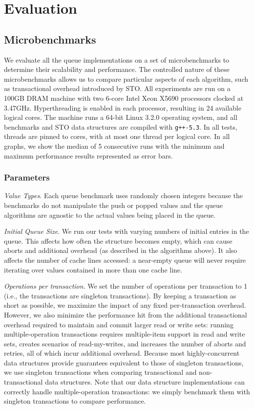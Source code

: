 \section{Evaluation}

\subsection{Microbenchmarks}
\label{q_microbenchmarks}

We evaluate all the queue implementations on a set of microbenchmarks to determine their scalability and performance. The controlled nature of these microbenchmarks allows us to compare particular aspects of each algorithm, such as transactional overhead introduced by STO. All experiments are run on a 100GB DRAM machine with two 6-core Intel Xeon X5690 processors clocked at 3.47GHz. Hyperthreading is enabled in each processor, resulting in 24 available logical cores. The machine runs a 64-bit Linux 3.2.0 operating system, and all benchmarks and STO data structures are compiled with \texttt{g++-5.3}. In all tests, threads are pinned to cores, with at most one thread per logical core.
In all graphs, we show the median of 5 consecutive runs with the minimum and maximum performance results represented as error bars.

\subsubsection{Parameters}

\emph{Value Types}. Each queue benchmark uses randomly chosen integers because the benchmarks do not manipulate the push or popped values and the queue algorithms are agnostic to the actual values being placed in the queue.

\emph{Initial Queue Size}. We run our tests with varying numbers of initial entries in the queue. This affects how often the structure becomes empty, which can cause aborts and additional overhead (as described in the algorithms above). It also affects the number of cache lines accessed: a near-empty queue will never require iterating over values contained in more than one cache line.

\emph{Operations per transaction}. We set the number of operations per transaction to 1 (i.e., the transactions are singleton transactions). By keeping a transaction as short as possible, we maximize the impact of any fixed per-transaction overhead. However, we also minimize the performance hit from the additional transactional overhead required to maintain and commit larger read or write sets: running multiple-operation transactions requires multiple-item support in read and write sets, creates scenarios of read-my-writes, and increases the number of aborts and retries, all of which incur additional overhead. 
Because most highly-concurrent data structures provide guarantees equivalent to those of singleton transactions, we use singleton transactions when comparing transactional and non-transactional data structures.
Note that our data structure implementations can correctly handle multiple-operation transactions: we simply benchmark them with singleton transactions to compare performance.

